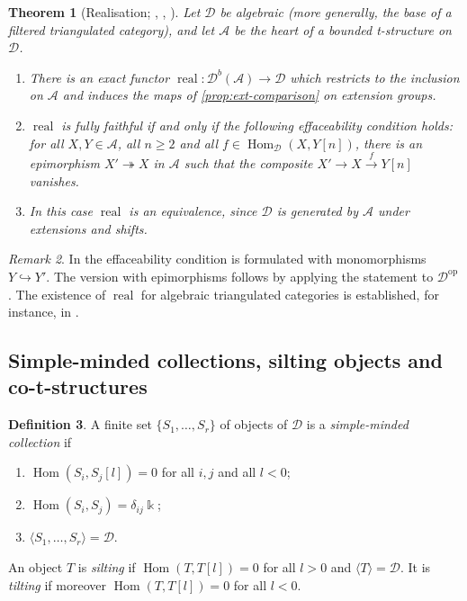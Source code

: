 \documentclass[11pt,reqno]{amsart}
\theoremstyle{plain}
\newtheorem{theorem}{Theorem}[section]
\theoremstyle{definition}
\newtheorem{definition}[theorem]{Definition}
\theoremstyle{remark}
\newtheorem{remark}[theorem]{Remark}
\newcommand{\kk}{\Bbbk}
\DeclareMathOperator{\Hom}{Hom}
\DeclareMathOperator{\real}{real}
\newcommand{\Db}{\mathcal{D}^b}
\newcommand{\thick}[1]{\langle #1\rangle}
\newcommand{\cD}{\mathcal{D}}
\newcommand{\cA}{\mathcal{A}}
\begin{document}
\begin{theorem}[{Realisation; \cite[\S3.1]{BBD82}, \cite{Bei87}, \cite{Let24}}]\label{thm:realisation}
Let $\cD$ be algebraic (more generally, the base of a filtered triangulated category), and let $\cA$ be the heart of a bounded t-structure on $\cD$.
\begin{enumerate}
\item There is an exact functor $\real\colon\Db(\cA)\to\cD$ which restricts to the inclusion on $\cA$ and induces the maps of \cref{prop:ext-comparison} on extension groups.
\item $\real$ is fully faithful if and only if the following \emph{effaceability} condition holds: for all $X,Y\in\cA$, all $n\ge2$ and all $f\in\Hom_\cD(X,Y[n])$, there is an epimorphism $X'\twoheadrightarrow X$ in $\cA$ such that the composite $X'\to X\xrightarrow{f}Y[n]$ vanishes.
\item In this case $\real$ is an equivalence, since $\cD$ is generated by $\cA$ under extensions and shifts.
\end{enumerate}
\end{theorem}

\begin{remark}
In \cite[Prop.~3.1.16]{BBD82} the effaceability condition is formulated with monomorphisms $Y\hookrightarrow Y'$. The version with epimorphisms follows by applying the statement to $\cD^{\mathrm{op}}$. The existence of $\real$ for algebraic triangulated categories is established, for instance, in \cite{Let24}.
\end{remark}

\subsection{Simple-minded collections, silting objects and co-t-structures}

\begin{definition}\label{def:smc}
A finite set $\{S_1,\dots,S_r\}$ of objects of $\cD$ is a \emph{simple-minded collection} if
\begin{enumerate}
\item[(SM1)] $\Hom(S_i,S_j[l])=0$ for all $i,j$ and all $l<0$;
\item[(SM2)] $\Hom(S_i,S_j)=\delta_{ij}\kk$;
\item[(SM3)] $\thick{S_1,\dots,S_r}=\cD$.
\end{enumerate}
An object $T$ is \emph{silting} if $\Hom(T,T[l])=0$ for all $l>0$ and $\thick{T}=\cD$. It is \emph{tilting} if moreover $\Hom(T,T[l])=0$ for all $l<0$.
\end{definition}
\end{document}
